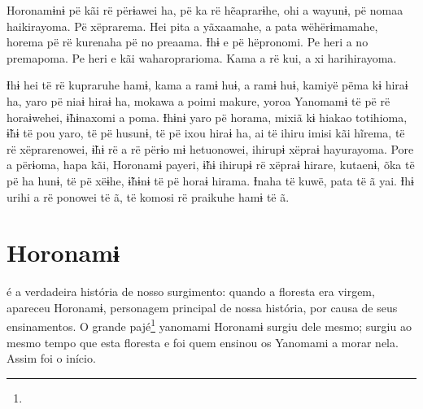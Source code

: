 Horonamɨnɨ pë kãi rë përɨawei ha, pë ka rë hẽaprarɨhe, ohi a wayunɨ, pë
nomaa haikirayoma. Pë xëprarema. Hei pita a yãxaamahe, a pata
wëhërɨmamahe, horema pë rë kurenaha pë no preaama. Ɨhɨ e pë hëpronomi.
Pe heri a no premapoma. Pe heri e kãi waharoprarioma. Kama a rë kui, a
xi harihirayoma. 


Ɨhɨ hei të rë kupraruhe hamɨ, kama a ramɨ huɨ, a ramɨ huɨ, kamiyë pëma
kɨ hiraɨ ha, yaro pë niaɨ hiraɨ ha, mokawa a poimi makure, yoroa
Yanomamɨ të pë rë horaɨwehei, ɨ̃hɨnaxomi a poma. Ɨhɨnɨ yaro pë horama,
mixiã kɨ hiakao totihioma, ɨ̃hɨ të pou yaro, të pë husunɨ, të pë ixou
hiraɨ ha, ai të ihiru imisi kãi hĩrema, të rë xëprarenowei, ɨ̃hɨ rë a rë
përɨo mɨ hetuonowei, ihirupɨ xëpraɨ hayurayoma. Pore a përɨoma, hapa
kãi, Horonamɨ payeri, ɨ̃hɨ ihirupɨ rë xëpraɨ hirare, kutaenɨ, õka të pë
ha hunɨ, të pë xëɨhe, ɨ̃hɨnɨ të pë horaɨ hirama. Ɨnaha të kuwë, pata të ã
yai. Ɨhɨ urihi a rë ponowei të ã, të komosi rë praikuhe hamɨ të ã.

\chapter{Horonamɨ}
 

 é a verdadeira história de nosso surgimento: quando a floresta era
virgem, apareceu Horonamɨ, personagem principal de nossa história, por
causa de seus ensinamentos. O grande pajé\footnote{}  yanomami Horonamɨ surgiu dele mesmo; surgiu ao mesmo tempo que esta floresta e
foi quem ensinou os Yanomami a morar nela. Assim foi o início. 


